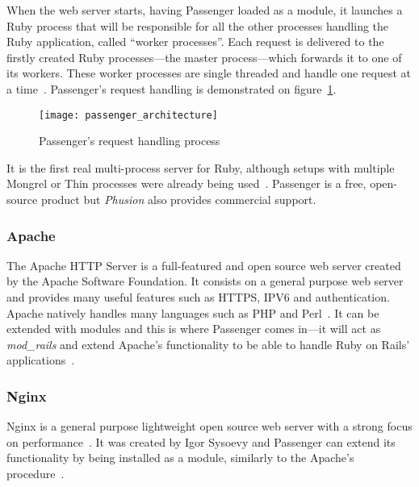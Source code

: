 When the web server starts, having Passenger loaded as a module, it launches a Ruby process that will be responsible for all the other processes handling the Ruby application, called ``worker processes''. Each request is delivered to the firstly created Ruby processes---the master process---which forwards it to one of its workers. These worker processes are single threaded and handle one request at a time~\cite{ruby_webservers}. Passenger's request handling is demonstrated on figure~\ref{fig:passenger_architecture}.
\begin{figure}[h!]
  \centering
    \texttt{[image: passenger\_architecture]}
  \caption{Passenger's request handling process}
  \label{fig:passenger_architecture}
\end{figure}
It is the first real multi-process server for Ruby, although setups with multiple Mongrel or Thin processes were already being used~\cite{passenger_whatis}. Passenger is a free, open-source product but \textit{Phusion} also provides commercial support.


\subsubsection{Apache}
The Apache HTTP Server is a full-featured and open source web server created by the Apache Software Foundation. It consists on a general purpose web server and provides many useful features such as HTTPS, IPV6 and authentication. Apache natively handles many languages such as PHP and Perl~\cite{apache_features}. It can be extended with modules and this is where Passenger comes in---it will act as \textit{mod\_rails} and extend Apache's functionality to be able to handle Ruby on Rails' applications~\cite{passenger_whatis}.


\subsubsection{Nginx}
Nginx is a general purpose lightweight open source web server with a strong focus on performance~\cite{nginx_features}. It was created by Igor Sysoevy and Passenger can extend its functionality by being installed as a module, similarly to the Apache's procedure~\cite{passenger_whatis}.


